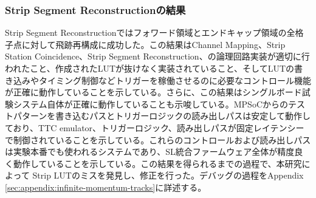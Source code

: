 \subsubsection*{Strip Segment Reconstructionの結果}
Strip Segment Reconstructionではフォワード領域とエンドキャップ領域の全格子点に対して飛跡再構成に成功した。この結果はChannel Mapping、Strip Station Coincidence、Strip Segment Reconstruction、の論理回路実装が適切に行われたこと、作成されたLUTが抜けなく実装されていること、そしてLUTの書き込みやタイミング制御などトリガーを稼働させるのに必要なコントロール機能が正確に動作していることを示している。さらに、この結果はシングルボード試験システム自体が正確に動作していることも示唆している。MPSoCからのテストパターンを書き込むパスとトリガーロジックの読み出しパスは安定して動作しており、TTC emulator、トリガーロジック、読み出しパスが固定レイテンシーで制御されていることを示している。これらのコントロールおよび読み出しパスは実験本番でも使われるシステムであり、SL統合ファームウェア全体が精度良く動作していることを示している。この結果を得られるまでの過程で、本研究によって
Strip LUTのミスを発見し、修正を行った。デバッグの過程をAppendix \ref{sec:appendix:infinite-momentum-tracks}に詳述する。

